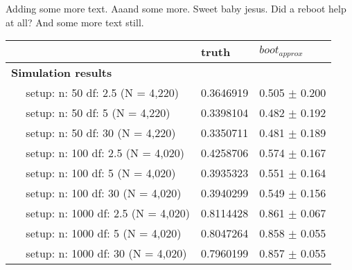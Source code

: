 \documentclass{article}
\begin{document}
Adding some more text. Aaand some more. Sweet baby jesus. Did a reboot help at all? And some more text still.

\begin{tabular}{l|l|l}
    \hline
    ~ & truth & $boot_{approx}$ \\
    \hline
    \bf{Simulation results} & ~ & ~\\
    \hline
    ~~ setup: n: 50 df: 2.5 (N = 4,220) & 0.3646919 & 0.505 $\pm$ 0.200\\
    \hline
    ~~ setup: n: 50 df: 5 (N = 4,220) & 0.3398104 & 0.482 $\pm$ 0.192\\
    \hline
    ~~ setup: n: 50 df: 30 (N = 4,220) & 0.3350711 & 0.481 $\pm$ 0.189\\
    \hline
    ~~ setup: n: 100 df: 2.5 (N = 4,020) & 0.4258706 & 0.574 $\pm$ 0.167\\
    \hline
    ~~ setup: n: 100 df: 5 (N = 4,020) & 0.3935323 & 0.551 $\pm$ 0.164\\
    \hline
    ~~ setup: n: 100 df: 30 (N = 4,020) & 0.3940299 & 0.549 $\pm$ 0.156\\
    \hline
    ~~ setup: n: 1000 df: 2.5 (N = 4,020) & 0.8114428 & 0.861 $\pm$ 0.067\\
    \hline
    ~~ setup: n: 1000 df: 5 (N = 4,020) & 0.8047264 & 0.858 $\pm$ 0.055\\
    \hline
    ~~ setup: n: 1000 df: 30 (N = 4,020) & 0.7960199 & 0.857 $\pm$ 0.055\\
    \hline
\end{tabular}
\end{document}
